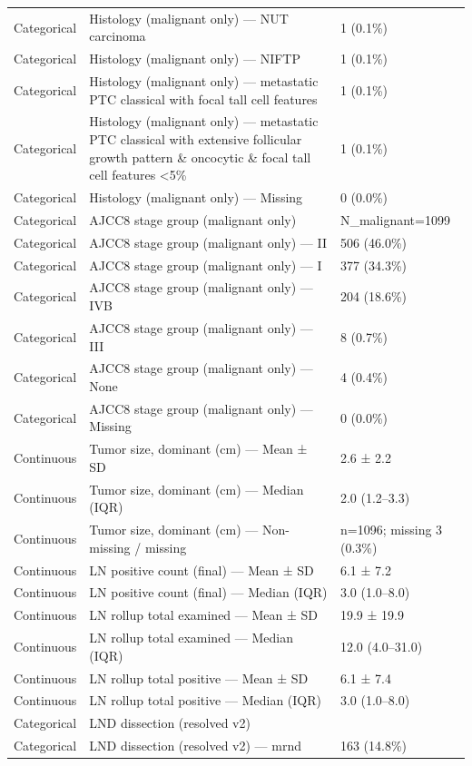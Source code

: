 \begin{table}[htbp]
\begin{tabular}{lll}
Categorical & Histology (malignant only) — NUT carcinoma & 1 (0.1\%) \\
Categorical & Histology (malignant only) — NIFTP & 1 (0.1\%) \\
Categorical & Histology (malignant only) — metastatic PTC classical with focal tall cell features & 1 (0.1\%) \\
Categorical & Histology (malignant only) — metastatic PTC classical with extensive follicular growth pattern \& oncocytic \& focal tall cell features <5\% & 1 (0.1\%) \\
Categorical & Histology (malignant only) — Missing & 0 (0.0\%) \\
Categorical & AJCC8 stage group (malignant only) & N\_malignant=1099 \\
Categorical & AJCC8 stage group (malignant only) — II & 506 (46.0\%) \\
Categorical & AJCC8 stage group (malignant only) — I & 377 (34.3\%) \\
Categorical & AJCC8 stage group (malignant only) — IVB & 204 (18.6\%) \\
Categorical & AJCC8 stage group (malignant only) — III & 8 (0.7\%) \\
Categorical & AJCC8 stage group (malignant only) — None & 4 (0.4\%) \\
Categorical & AJCC8 stage group (malignant only) — Missing & 0 (0.0\%) \\
Continuous & Tumor size, dominant (cm) — Mean ± SD & 2.6 ± 2.2 \\
Continuous & Tumor size, dominant (cm) — Median (IQR) & 2.0 (1.2–3.3) \\
Continuous & Tumor size, dominant (cm) — Non-missing / missing & n=1096; missing 3 (0.3\%) \\
Continuous & LN positive count (final) — Mean ± SD & 6.1 ± 7.2 \\
Continuous & LN positive count (final) — Median (IQR) & 3.0 (1.0–8.0) \\
Continuous & LN rollup total examined — Mean ± SD & 19.9 ± 19.9 \\
Continuous & LN rollup total examined — Median (IQR) & 12.0 (4.0–31.0) \\
Continuous & LN rollup total positive — Mean ± SD & 6.1 ± 7.4 \\
Continuous & LN rollup total positive — Median (IQR) & 3.0 (1.0–8.0) \\
Categorical & LND dissection (resolved v2) &  \\
Categorical & LND dissection (resolved v2) — mrnd & 163 (14.8\%) \\

\end{tabular}
\end{table}
